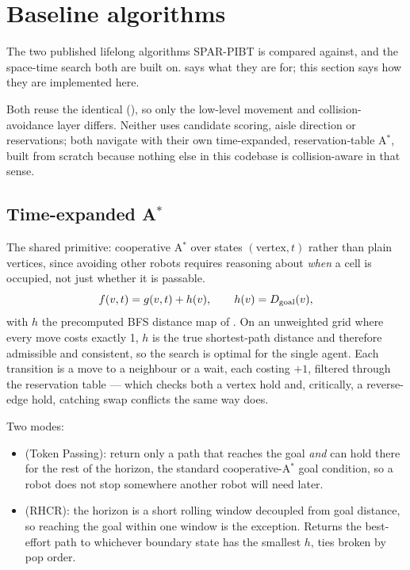 \section{Baseline algorithms}
\label{sec:baselines}

\begin{lede}
The two published lifelong algorithms SPAR-PIBT is compared against, and the
space-time search both are built on.  says what they are
for; this section says how they are implemented here.
\end{lede}

Both reuse the identical 
(), so only the low-level movement and
collision-avoidance layer differs. Neither uses candidate scoring, aisle
direction or reservations; both navigate with their own time-expanded,
reservation-table A$^\ast$, built from scratch because nothing else in this
codebase is collision-aware in that sense.

\subsection{Time-expanded \texorpdfstring{A$^\ast$}{A*}}
\label{sec:baselines-astar}

The shared primitive: cooperative A$^\ast$ over states $(\text{vertex}, t)$
rather than plain vertices, since avoiding other robots requires reasoning
about \emph{when} a cell is occupied, not just whether it is passable.
\begin{equation}
  f(v, t) = g(v, t) + h(v),
  \qquad
  h(v) = D_{\mathrm{goal}}(v),
\end{equation}
with $h$ the precomputed BFS distance map of . On an
unweighted grid where every move costs exactly 1, $h$ is the true shortest-path
distance and therefore admissible and consistent, so the search is optimal for
the single agent. Each transition is a move to a neighbour or a wait, each
costing $+1$, filtered through the reservation table --- which checks both a
vertex hold and, critically, a reverse-edge hold, catching swap conflicts the
same way  does.

Two modes:
\begin{itemize}
\item {} (Token Passing): return only a path that
  reaches the goal \emph{and} can hold there for the rest of the horizon, the
  standard cooperative-A$^\ast$ goal condition, so a robot does not stop
  somewhere another robot will need later.
\item {} (RHCR): the horizon is a short rolling window
  decoupled from goal distance, so reaching the goal within one window is the
  exception. Returns the best-effort path to whichever boundary state has the
  smallest $h$, ties broken by pop order.
\end{itemize}

